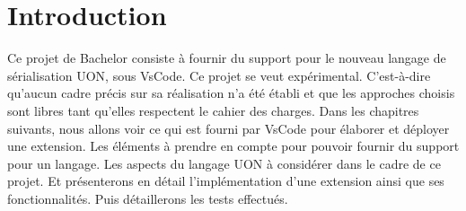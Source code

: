 \documentclass[
    iict, %
    il, %
]{heig-tb}
\begin{document}
\maketitle
\frontmatter
\clearemptydoublepage

\preamble
\let\cleardoublepage\clearpage
\authentification
\let\cleardoublepage\clearpage

\begin{abstract}
    
\end{abstract}

\clearemptydoublepage
{
    \tableofcontents
    \let\cleardoublepage\clearpage
    \listoffigures
    \let\cleardoublepage\clearpage
    \listoftables
    \let\cleardoublepage\clearpage
    \listoflistings
}

\printnomenclature
\clearemptydoublepage
{}

\pagestyle{fancy}

\fancyhf{}
\renewcommand\headrulewidth{1pt}

\fancyhead[L]{\itshape\nouppercase{\leftmark}}

\renewcommand\footrulewidth{1pt}


\renewcommand{\headrulewidth}{0.4pt}
\renewcommand{\footrulewidth}{0.4pt}


\mainmatter
\chapter{Introduction}
Ce projet de Bachelor consiste à fournir du support pour le nouveau langage de sérialisation UON, sous VsCode. Ce projet se veut expérimental. C'est-à-dire qu'aucun cadre précis sur sa réalisation n'a été établi et que les approches choisis sont libres tant qu'elles respectent le cahier des charges.
Dans les chapitres suivants, nous allons voir ce qui est fourni par VsCode pour élaborer et déployer une extension.
Les éléments à prendre en compte pour pouvoir fournir du support pour un langage.
Les aspects du langage UON à considérer dans le cadre de ce projet.
Et présenterons en détail l'implémentation d'une extension ainsi que ses fonctionnalités. Puis détaillerons les tests effectués.
\end{document}
